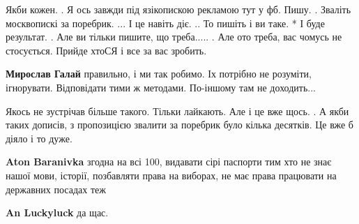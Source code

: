 \begin{itemize}
\begin{itemize}
\obeycr
Якби кожен.
.
Я ось завжди під язікопискою рекламою тут у фб.
Пишу.
.
Зваліть москвопискі за поребрик.
...
І це навіть діє.
..
То пишіть і
ви таке.
*
І буде результат.
.
Але ви тільки пишите, що треба.....
.
Але ото треба, вас чомусь не стосується.
Прийде хтоСЯ і все за вас зробить.
\restorecr

\begin{itemize}
 
\textbf{Мирослав Галай} правильно, і ми так робимо. Іх потрібно не розуміти, ігнорувати. Відповідати тими ж методами. По-іншому там не доходить...
\end{itemize}

 
Якось не зустрічав більше такого.
Тільки лайкають. Але і це вже щось.
.
А якби таких дописів, з пропозицією звалити за поребрик було кілька десятків.
Це вже б діяло і то дуже.

 
\textbf{Aton Baranivka} згодна на всі 100, видавати сірі паспорти тим хто не знає нашої мови, історії, позбавляти права на виборах, не має права працювати на державних посадах теж

\begin{itemize}
 
\textbf{An Luckyluck} да щас.

 

\end{itemize}
\end{itemize}
\end{itemize}
